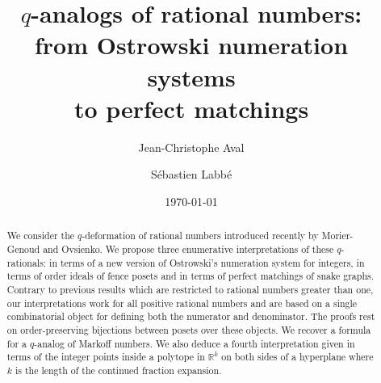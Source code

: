 \documentclass[a4paper,12pt]{amsart}
\newcommand{\0}{\mathtt{0}}
\newcommand{\1}{\mathtt{1}}
\newcommand{\2}{\mathtt{2}}
\newcommand{\3}{\mathtt{3}}
\begin{document}
%
%
\title[$q$-analogs of rational numbers]
{$q$-analogs of rational numbers:\\ from Ostrowski numeration systems\\to perfect matchings}

\author[J.-C.~Aval]{Jean-Christophe Aval}
\address[J.-C.~Aval]{Univ. Bordeaux, CNRS, Bordeaux INP, LaBRI, UMR 5800, F-33400 Talence, France}

\author[S.~Labb\'e]{S\'ebastien Labb\'e}
\address[S.~Labb\'e]{CNRS -- Université de Montréal CRM-CNRS, Montréal, Canada}
%
%
%


%
%
%
%
%
%
%
%
%
%
%
%
%

%
%
%
%
%
%
%
%

%
%
%
%
%
%
%
%
%
%
%
%
%
%
%
%
%
%
%

\date{\today}

\begin{abstract}
We consider the $q$-deformation of rational numbers introduced recently by Morier-Genoud and Ovsienko. We propose three enumerative interpretations of these $q$-rationals: in terms of a new version of Ostrowski's numeration system for integers, in terms of order ideals of fence posets and in terms of perfect matchings of snake graphs. %
    Contrary to previous results which are restricted to rational numbers greater than one, our interpretations work for all positive rational numbers and are based on a single combinatorial object for defining both the numerator and denominator. The proofs rest on order-preserving bijections between posets over these objects. We recover a formula for a $q$-analog of Markoff numbers. We also deduce a fourth interpretation given in terms of the integer points inside a polytope in $\mathbb{R}^k$ on both sides of a hyperplane where $k$ is the length of the continued fraction expansion.
\end{abstract}

\maketitle
\end{document}
